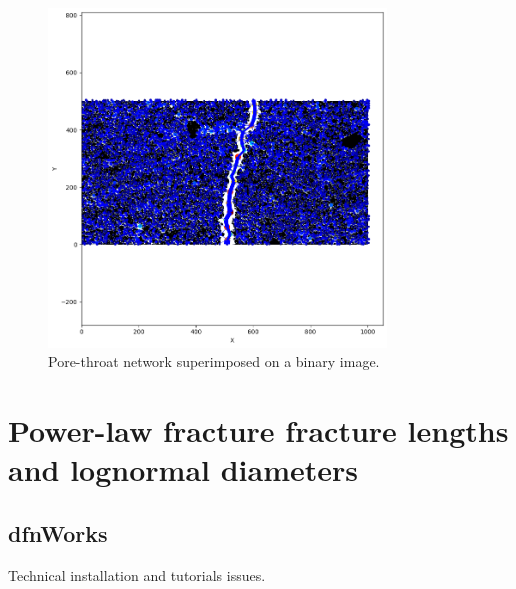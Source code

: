\documentclass{article}
\begin{document}
\begin{figure}[htbp]
    \centering
    \includegraphics[width=0.8\textwidth]{images/digitalRocks/fractureNetwork.png}
    \caption{Pore-throat network superimposed on a binary image.}
    \label{fig:FractureNet}
\end{figure}

\FloatBarrier  %
\section{Power-law fracture fracture lengths and lognormal diameters}
\subsection{dfnWorks}
Technical installation and tutorials issues.
\end{document}
